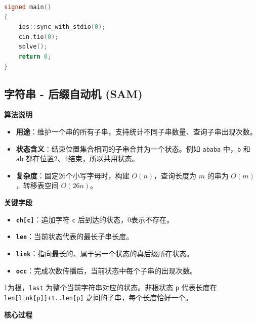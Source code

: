 \documentclass[10pt,landscape,a4paper]{article}
\begin{document}
\begin{multicols*}{3}
\begin{lstlisting}[language=C++]
signed main()
{
    ios::sync_with_stdio(0);
    cin.tie(0);
    solve();
    return 0;
}
\end{lstlisting}
\subsection*{字符串 - 后缀自动机 (SAM)}
\par\addvspace{0.7ex}\noindent\textbf{算法说明}\par\nobreak
\begin{itemize}
\item \textbf{用途}：维护一个串的所有子串，支持统计不同子串数量、查询子串出现次数。
\item \textbf{状态含义}：结束位置集合相同的子串合并为一个状态。例如 \texttt{a\allowbreak{}b\allowbreak{}a\allowbreak{}b\allowbreak{}a} 中，\texttt{b} 和 \texttt{a\allowbreak{}b} 都在位置2、4结束，所以共用状态。
\item \textbf{复杂度}：固定26个小写字母时，构建 $O(n)$，查询长度为 $m$ 的串为 $O(m)$，转移表空间 $O(26n)$。
\end{itemize}
\par\addvspace{0.7ex}\noindent\textbf{关键字段}\par\nobreak
\begin{itemize}
\item \textbf{\texttt{c\allowbreak{}h\allowbreak{}[\allowbreak{}c\allowbreak{}]}}：追加字符 \texttt{c} 后到达的状态，0表示不存在。
\item \textbf{\texttt{l\allowbreak{}e\allowbreak{}n}}：当前状态代表的最长子串长度。
\item \textbf{\texttt{l\allowbreak{}i\allowbreak{}n\allowbreak{}k}}：指向最长的、属于另一个状态的真后缀所在状态。
\item \textbf{\texttt{o\allowbreak{}c\allowbreak{}c}}：完成次数传播后，当前状态中每个子串的出现次数。
\end{itemize}
1为根，\texttt{l\allowbreak{}a\allowbreak{}s\allowbreak{}t} 为整个当前字符串对应的状态。非根状态 \texttt{p} 代表长度在 \texttt{l\allowbreak{}e\allowbreak{}n\allowbreak{}[\allowbreak{}l\allowbreak{}i\allowbreak{}n\allowbreak{}k\allowbreak{}[\allowbreak{}p\allowbreak{}]\allowbreak{}]\allowbreak{}+\allowbreak{}1\allowbreak{}.\allowbreak{}.\allowbreak{}l\allowbreak{}e\allowbreak{}n\allowbreak{}[\allowbreak{}p\allowbreak{}]} 之间的子串，每个长度恰好一个。\par
\par\addvspace{0.7ex}\noindent\textbf{核心过程}\par\nobreak

\end{multicols*}
\end{document}
